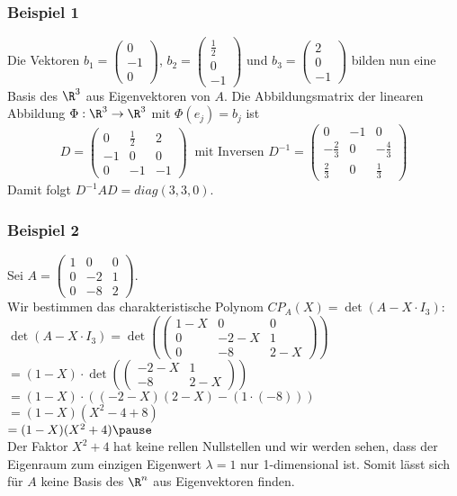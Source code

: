 \begin{frame}\frametitle{Beispiel 1}
Die Vektoren $b_1=\begin{pmatrix} 0 \\ -1 \\ 0\end{pmatrix}$, $b_2=\begin{pmatrix} \frac{1}{2} \\ 0 \\ -1\end{pmatrix}$ und $b_3=\begin{pmatrix} 2 \\ 0 \\ -1\end{pmatrix}$ bilden nun eine Basis des $\R^3$ aus Eigenvektoren von $A$. Die Abbildungsmatrix der linearen Abbildung $\Phi: \R^3 \to \R^3$ mit $\Phi(e_j)=b_j$ ist 
$$
D=\begin{pmatrix} 0 & \frac{1}{2} & 2\\ -1 & 0 & 0 \\ 0 & -1 & -1\end{pmatrix} \ \text{ mit Inversen } D^{-1}=\begin{pmatrix}0&-1&0 \\ -\frac{2}{3} & 0& -\frac{4}{3} \\ \frac{2}{3} &0 &\frac{1}{3} \end{pmatrix}
$$\vfill
Damit folgt $D^{-1}AD=diag(3,3,0)$.
\end{frame}
%
%
\begin{frame}\frametitle{Beispiel 2}

Sei $A=\begin{pmatrix} 1 & 0 & 0 \\ 0 & -2 & 1 \\ 0 & -8 &2 \end{pmatrix}$. \\Wir bestimmen das charakteristische Polynom $CP_A(X)=\det(A-X\cdot I_3)$:\\ \vfill\pause
$
\det(A-X\cdot I_3)=\det(\begin{pmatrix} 1-X & 0 & 0 \\ 0 & -2-X & 1 \\ 0 & -8 &2-X \end{pmatrix})$\\\pause
\hspace{24.5mm}$=(1-X) \cdot \det(\begin{pmatrix}  -2-X & 1 \\  -8 &2-X \end{pmatrix})$\\\pause
\hspace{24.5mm}$=(1-X)\cdot((-2-X)(2-X)-(1\cdot (-8)))$\\\pause
\hspace{24.5mm}$=(1-X) (X^2-4+8)$\\\pause
\hspace{24.5mm}$=(1-X) (X^2+4)\pause
$\\\vfill
Der Faktor $X^2+4$ hat keine rellen Nullstellen und wir werden sehen, dass der Eigenraum zum einzigen Eigenwert $\lambda=1$ nur 1-dimensional ist. Somit lässt sich für $A$ keine Basis des $\R^n$ aus Eigenvektoren finden.	
\end{frame}
